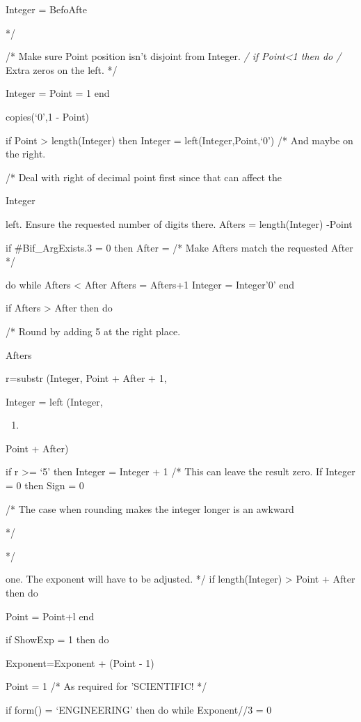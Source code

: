 Integer = Befo\textbar\textbar Afte

*/

/* Make sure Point position isn't disjoint from Integer. \emph{/ if
Point\textless1 then do /} Extra zeros on the left. */

Integer = Point = 1 end

copies(`0',1 - Point)

if Point \textgreater{} length(Integer) then Integer =
left(Integer,Point,`0') /* And maybe on the right.

/* Deal with right of decimal point first since that can affect the

\textbar\textbar{} Integer

left. Ensure the requested number of digits there. Afters =
length(Integer) -Point

if \#Bif\_ArgExists.3 = 0 then After = /* Make Afters match the
requested After */

do while Afters \textless{} After Afters = Afters+1 Integer = Integer'0'
end

if Afters \textgreater{} After then do

/* Round by adding 5 at the right place.

Afters

r=substr (Integer, Point + After + 1,

Integer = left (Integer,

\begin{enumerate}
\def\labelenumi{\arabic{enumi})}
\tightlist
\item
\end{enumerate}

Point + After)

if r \textgreater= `5' then Integer = Integer + 1 /* This can leave the
result zero. If Integer = 0 then Sign = 0

/* The case when rounding makes the integer longer is an awkward

*/

*/

one. The exponent will have to be adjusted. */ if length(Integer)
\textgreater{} Point + After then do

Point = Point+l end

if ShowExp = 1 then do

Exponent=Exponent + (Point - 1)

Point = 1 /* As required for 'SCIENTIFIC! */

if form() = `ENGINEERING' then do while Exponent//3 = 0

